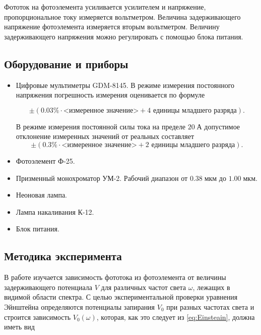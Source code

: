\documentclass[a4paper, 12pt]{article}
\newcommand{\um}{\; мкм}
\newcommand{\A}{\; А}
\begin{document}
	Фототок на фотоэлемента усиливается усилителем и напряжение, пропорциональное току измеряется вольтметром. Величина задерживающего напряжение фотоэлемента измеряется вторым вольтметром. Величину задерживающего напряжения можно регулировать с помощью блока питания.
 
    \subsection{Оборудование и приборы}

    \begin{itemize}	
        \item Цифровые мультиметры GDM-8145. В режиме измерения постоянного напряжения погрешность измерения оценивается по формуле 
        
        $$
        \pm (0.03\% \cdot \text{<измеренное значение>} + 4 \text{ единицы младшего разряда}).
        $$
        
        В режиме измерения постоянной силы тока на пределе $20 \A$ допустимое отклонение измеренных значений от реальных составляет 
        $$
        \pm (0.3\% \cdot \text{<измеренное значение>} + 2\text{ единицы младшего разряда}).
        $$

        \item Фотоэлемент Ф-25.
		
		\item Призменный монохроматор УМ-2. Рабочий диапазон от $0.38 \um$ до $1.00 \um$.
		
		\item Неоновая лампа.
		
		\item Лампа накаливания К-12.

        \item Блок питания.
    \end{itemize}

    \subsection{Методика эксперимента}

    В работе изучается зависимость фототока из фотоэлемента от величины задерживающего потенциала $V$ для различных частот света $\omega$, лежащих в видимой области спектра. С целью экспериментальной проверки уравнения Эйнштейна определяются потенциалы запирания $V_0$ при разных частотах света и строится зависимость $V_0(\omega)$, которая, как это следует из \eqref{eq:Einsteain}, должна иметь вид
	
\end{document}
